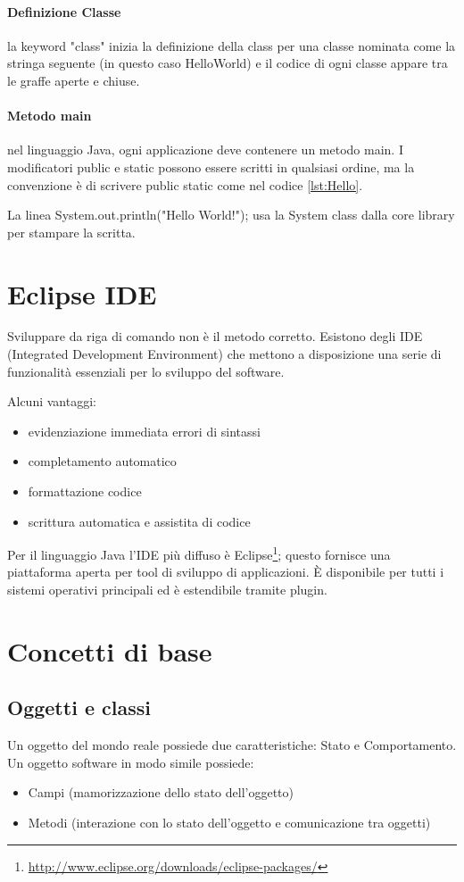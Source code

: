 \documentclass[a4paper,12pt,twoside]{book}
\begin{document}
\paragraph{Definizione Classe} la keyword "class" inizia la
definizione della class per una classe nominata come la stringa
seguente (in questo caso HelloWorld) e il codice di ogni classe appare
tra le graffe aperte e chiuse.

\paragraph{Metodo main} nel linguaggio Java, ogni applicazione deve
contenere un metodo main. I modificatori public e static possono
essere scritti in qualsiasi ordine, ma la convenzione è di scrivere
public static come nel codice \ref{lst:Hello}.

La linea System.out.println("Hello World!"); usa la System class dalla
core library per stampare la scritta.

\section{Eclipse IDE}

Sviluppare da riga di comando non è il metodo corretto. Esistono degli
IDE (Integrated Development Environment) che mettono a disposizione
una serie di funzionalità essenziali per lo sviluppo del software.

Alcuni vantaggi:
\begin{itemize}
\item evidenziazione immediata errori di sintassi
\item completamento automatico
\item formattazione codice
\item scrittura automatica e assistita di codice
\end{itemize}

Per il linguaggio Java l'IDE più diffuso è Eclipse\footnote{\url{http://www.eclipse.org/downloads/eclipse-packages/}}; questo fornisce
una piattaforma aperta per tool di sviluppo di applicazioni. È
disponibile per tutti i sistemi operativi principali ed è estendibile
tramite plugin.

\section{Concetti di base}

\subsection{Oggetti e classi}
Un oggetto del mondo reale possiede due caratteristiche: Stato e
Comportamento.
Un oggetto software in modo simile possiede:
\begin{itemize}
\item Campi (mamorizzazione dello stato dell'oggetto)
\item Metodi (interazione con lo stato dell'oggetto e comunicazione
  tra oggetti)
\end{itemize}
\end{document}
